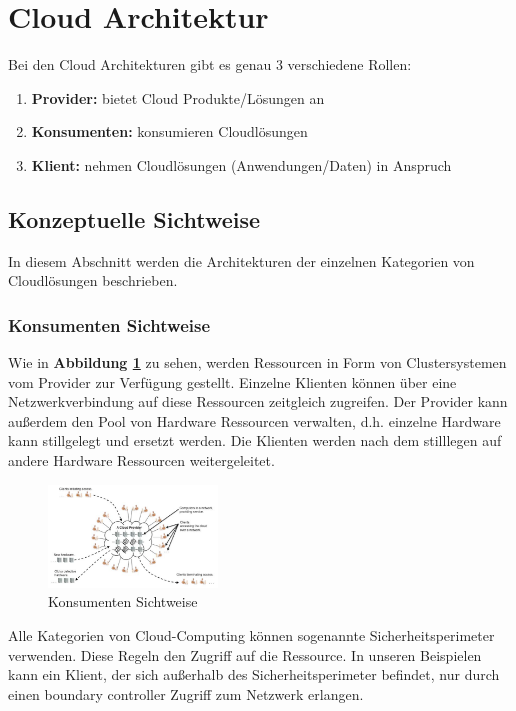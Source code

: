\section{Cloud Architektur}

Bei den Cloud Architekturen gibt es genau 3 verschiedene Rollen:
\begin{enumerate}
	\item \textbf{Provider:} bietet Cloud Produkte/Lösungen an
	\item \textbf{Konsumenten:} konsumieren Cloudlösungen
	\item \textbf{Klient:} nehmen Cloudlösungen (Anwendungen/Daten) in Anspruch
\end{enumerate}

\subsection{Konzeptuelle Sichtweise}

In diesem Abschnitt werden die Architekturen der einzelnen Kategorien von Cloudlösungen beschrieben.

\subsubsection{Konsumenten Sichtweise}

Wie in \textbf{Abbildung \ref{ConsumerView}} zu sehen, werden Ressourcen in Form von Clustersystemen vom Provider zur Verfügung gestellt.
Einzelne Klienten können über eine Netzwerkverbindung auf diese Ressourcen zeitgleich zugreifen. Der Provider kann außerdem den Pool
von Hardware Ressourcen verwalten, d.h. einzelne Hardware kann stillgelegt und ersetzt werden. Die Klienten werden nach dem stilllegen
auf andere Hardware Ressourcen weitergeleitet.
\begin{figure}[H]
    \centering
	\includegraphics[width=0.4\textwidth]{Images/ConsumerView}
	\caption{Konsumenten Sichtweise \cite{Badger}}
	\label{ConsumerView}
\end{figure}

Alle Kategorien von Cloud-Computing können sogenannte Sicherheitsperimeter verwenden. Diese Regeln den Zugriff auf die Ressource.
In unseren Beispielen kann ein Klient, der sich außerhalb des Sicherheitsperimeter befindet, nur durch einen \glqq boundary controller\grqq
Zugriff zum Netzwerk erlangen.

